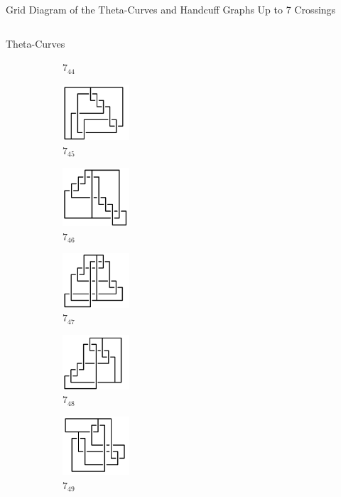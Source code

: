 \documentclass[final]{beamer}
\begin{document}
\begin{frame}[t]
\begin{alertblock}{Grid Diagram of the Theta-Curves and Handcuff Graphs Up to 7 Crossings}
\begin{columns}[t]
\begin{column}{0.7\textwidth}
\begin{alertblock}{Theta-Curves}
\begin{figure}
\begin{subfigure}{0.075\textwidth}
    \caption{$7_{44}$} 
    \end{subfigure}
    \begin{subfigure}{0.075\textwidth}
    \includegraphics[width=2.5cm]{../Midterm_Poster/grid_diagram/theta_7_45.png}
    \caption{$7_{45}$} 
    \end{subfigure}
    \begin{subfigure}{0.075\textwidth}
    \includegraphics[width=2.5cm]{../Midterm_Poster/grid_diagram/theta_7_46.png}
    \caption{$7_{46}$} 
    \end{subfigure}
    \begin{subfigure}{0.075\textwidth}
    \includegraphics[width=2.5cm]{../Midterm_Poster/grid_diagram/theta_7_47.png}
    \caption{$7_{47}$} 
    \end{subfigure}
    \begin{subfigure}{0.075\textwidth}
    \includegraphics[width=2.5cm]{../Midterm_Poster/grid_diagram/theta_7_48.png}
    \caption{$7_{48}$} 
    \end{subfigure}
    \begin{subfigure}{0.075\textwidth}
    \includegraphics[width=2.5cm]{../Midterm_Poster/grid_diagram/theta_7_49.png}
    \caption{$7_{49}$} 
    \end{subfigure}
    \begin{subfigure}{0.075\textwidth}

\end{subfigure}
\end{figure}
\end{alertblock}
\end{column}
\end{columns}
\end{alertblock}
\end{frame}
\end{document}

